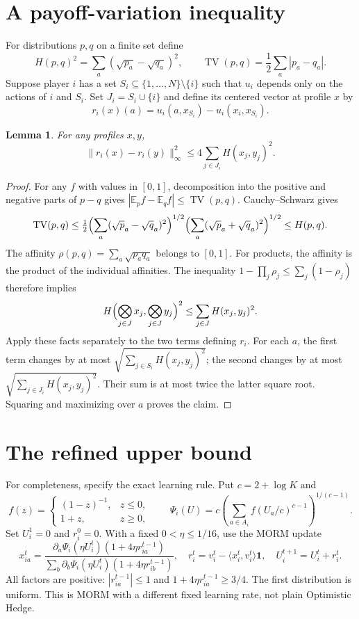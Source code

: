 \documentclass[11pt]{article}
\newtheorem{lemma}[theorem]{Lemma}
\newcommand{\TV}{\operatorname{TV}}
\newcommand{\ip}[2]{\langle #1,#2\rangle}
\begin{document}
\section{A payoff-variation inequality}
For distributions $p,q$ on a finite set define
\[
 H(p,q)^2=\sum_a(\sqrt{p_a}-\sqrt{q_a})^2,
 \qquad \TV(p,q)=\frac12\sum_a|p_a-q_a|.
\]
Suppose player $i$ has a set $S_i\subseteq\{1,\ldots,N\}\setminus\{i\}$
such that $u_i$ depends only on the actions of $i$ and $S_i$.
Set $J_i=S_i\cup\{i\}$ and define its centered vector at profile $x$ by
\[
 r_i(x)(a)=u_i(a,x_{S_i})-u_i(x_i,x_{S_i}).
\]

\begin{lemma}\label{lem:variation}
For any profiles $x,y$,
\[
 \|r_i(x)-r_i(y)\|_\infty^2
 \leq4\sum_{j\in J_i}H(x_j,y_j)^2.
\]
\end{lemma}
\begin{proof}
For any $f$ with values in $[0,1]$, decomposition into the positive and
negative parts of $p-q$ gives
$|\mathbb E_p f-\mathbb E_q f|\leq\TV(p,q)$.
Cauchy--Schwarz gives
\[
 \TV(p,q)\leq\tfrac12
 \Bigl(\sum_a(\sqrt p_a-\sqrt q_a)^2\Bigr)^{1/2}
 \Bigl(\sum_a(\sqrt p_a+\sqrt q_a)^2\Bigr)^{1/2}
 \leq H(p,q).
\]
The affinity $\rho(p,q)=\sum_a\sqrt{p_aq_a}$ belongs to $[0,1]$.
For products, the affinity is the product of the individual affinities.
The inequality $1-\prod_j\rho_j\leq\sum_j(1-\rho_j)$ therefore implies
\[
 H\Bigl(\bigotimes_{j\in J}x_j,\bigotimes_{j\in J}y_j\Bigr)^2
 \leq\sum_{j\in J}H(x_j,y_j)^2.
\]
Apply these facts separately to the two terms defining $r_i$.
For each $a$, the first term changes by at most
$\sqrt{\sum_{j\in S_i}H(x_j,y_j)^2}$; the second changes by at most
$\sqrt{\sum_{j\in J_i}H(x_j,y_j)^2}$.
Their sum is at most twice the latter square root. Squaring and maximizing
over $a$ proves the claim.
\end{proof}

\section{The refined upper bound}
For completeness, specify the exact learning rule. Put $c=2+\log K$ and
\[
 f(z)=\begin{cases}(1-z)^{-1},&z\leq0,\\1+z,&z\geq0,\end{cases}
 \qquad
 \Psi_i(U)=c\left(\sum_{a\in A_i}f(U_a/c)^{c-1}\right)^{1/(c-1)}.
\]
Set $U_i^1=0$ and $r_i^0=0$. With a fixed $0<\eta\leq1/16$, use
the MORM update
\[
 x_{ia}^t=
 \frac{\partial_a\Psi_i(\eta U_i^t)(1+4\eta r_{ia}^{t-1})}
 {\sum_b\partial_b\Psi_i(\eta U_i^t)(1+4\eta r_{ib}^{t-1})},
 \quad r_i^t=v_i^t-\ip{x_i^t}{v_i^t}\mathbf1,
 \quad U_i^{t+1}=U_i^t+r_i^t.
\]
All factors are positive: $|r_{ia}^{t-1}|\leq1$ and
$1+4\eta r_{ia}^{t-1}\geq3/4$. The first distribution is uniform.
This is MORM with a different fixed learning rate, not plain Optimistic
Hedge.
\end{document}

